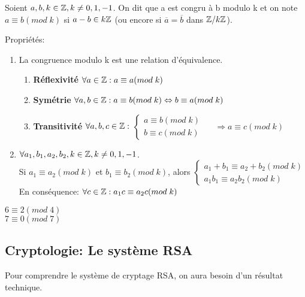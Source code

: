\begin{defn}
Soient $a,b,k \in \mathbb{Z}, k \neq 0,1,-1$. On dit que a est congru à b modulo k et on note $a \equiv b(mod\;k)$ si $a-b \in k\mathbb{Z}$ (ou encore si $\overline{a} = \overline{b}$ dans $\mathbb{Z}/k\mathbb{Z}$). \\
\end{defn}

Propriétés:

\begin{enumerate}
\item La congruence modulo k est une relation d'équivalence.
	\begin{enumerate}[-]
	\item \textbf{Réflexivité} $\forall a \in \mathbb{Z}: a \equiv a(mod\;k)$
	\item \textbf{Symétrie} $\forall a,b \in \mathbb{Z}: a \equiv b(mod\;k) \Leftrightarrow b \equiv a(mod\;k)$
	\item \textbf{Transitivité} $\forall a,b,c \in \mathbb{Z}:$
				$ \left\{\begin{matrix}
				a \equiv b(mod\;k)\\ 
				b \equiv c(mod\;k)
				\end{matrix}\right.$ $\quad \Rightarrow a\equiv c(mod\;k)$
	\end{enumerate}

\item $\forall a_1,b_1,a_2,b_2,k \in \mathbb{Z}, k\neq 0,1,-1$. \\
Si $a_1 \equiv a_2 (mod\;k)$ et $b_1 \equiv b_2 (mod\;k)$, alors $\left\{\begin{matrix}
					a_1 + b_1 \equiv a_2 + b_2 (mod\;k)\\ 
					a_1 b_1 \equiv a_2 b_2 (mod\;k)
					\end{matrix}\right.$\\
En conséquence: $\forall c\in \mathbb{Z}: a_1 c \equiv a_2 c(mod\;k)$
\end{enumerate}

\begin{exmp}
$6 \equiv 2(mod\;4)$\\
$7 \equiv 0(mod\;7)$
\end{exmp}

\newpage

\subsection{Cryptologie: Le système RSA}

Pour comprendre le système de cryptage RSA, on aura besoin d'un résultat technique.

